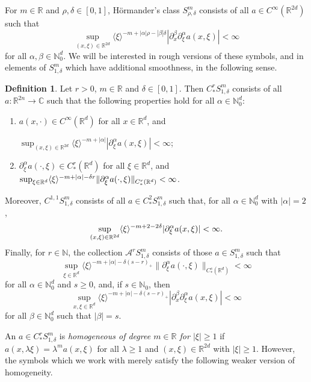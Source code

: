 \documentclass{amsart}
\numberwithin{equation}{section}
\theoremstyle{definition}
\newtheorem{definition}[theorem]{Definition}
\newcommand{\R}{\mathbb{R}}
\newcommand{\Rd}{\mathbb{R}^{d}}
\newcommand{\Rn}{\mathbb{R}^{d}}
\newcommand{\N}{\mathbb{N}}
\newcommand{\C}{\mathbb{C}}
\newcommand {\A}{\mathcal{A}}
\newcommand {\la}{\lambda}
\newcommand {\rb}{\rangle}
\newcommand {\lb}{\langle}
\begin{document}
For $m\in\R$ and $\rho,\delta\in[0,1]$, H\"{o}rmander's class $S^{m}_{\rho,\delta}$ consists of all $a\in C^{\infty}(\R^{2d})$ such that 
\[
\sup_{(x,\xi)\in\R^{2d}}\lb \xi\rb^{-m+|\alpha|\rho-|\beta|\delta}|\partial_{x}^{\beta}\partial_{\xi}^{\alpha}a(x,\xi)|<\infty
\]
for all $\alpha,\beta\in\N_{0}^{d}$. 
We will be interested in rough versions of these symbols,  
and in elements of $S^{m}_{1,\delta}$ which have additional smoothness, in the following sense.


\begin{definition}\label{def:symbolrough}
Let $r>0$, $m\in\R$ and $\delta\in[0,1]$. Then $C^{r}_{*}S^{m}_{1,\delta}$ consists of all $a:\R^{2n}\to\C$ such that the following properties hold for all $\alpha\in \N_{0}^{d}$:
\begin{enumerate}
\item\label{it:symbolrough1} $a(x,\cdot)\in C^{\infty}(\Rn)$ for all $x\in\Rn$, and 

$\sup_{(x,\xi)\in\R^{2d}}\lb\xi\rb^{-m+|\alpha|}|\partial_{\xi}^{\alpha}a(x,\xi)|<\infty$; 
\item\label{it:symbolrough2} $\partial_{\xi}^{\alpha}a(\cdot,\xi)\in C^{r}_{*}(\Rn)$ for all $\xi\in\Rn$,  
and
$\sup_{\xi\in\Rd}\lb\xi\rb^{-m+|\alpha|-\delta r}\|\partial_{\xi}^{\alpha}a(\cdot,\xi)\|_{C^{r}_{*}(\Rd)}\linebreak<\infty$.
\end{enumerate} 
Moreover, $C^{1,1}S^{m}_{1,\delta}$ consists of all $a\in C^{2}_{*}S^{m}_{1,\delta}$ such that, for all $\alpha\in \N_{0}^{d}$ with $|\alpha|=2$,
\[
\sup_{(x,\xi)\in\R^{2d}}\lb\xi\rb^{-m+2-2\delta}|\partial_{\xi}^{\alpha}a(x,\xi)|\linebreak<\infty.
\]
Finally, for $r\in\N$, the collection $\A^{r}S^{m}_{1,\delta}$ consists of those $a\in S^{m}_{1,\delta}$ such that 
\[
\sup_{\xi\in\Rd}\lb\xi\rb^{-m+|\alpha|-\delta(s-r)_{+}}\|\partial_{\xi}^{\alpha}a(\cdot,\xi)\|_{C^{s}_{*}(\Rd)}<\infty
\] 
for all $\alpha\in\N_{0}^{d}$ and $s\geq0$, and, if $s\in\N_{0}$, then 
\[
\sup_{x,\xi\in\Rd}\lb\xi\rb^{-m+|\alpha|-\delta(s-r)_{+}}|\partial_{x}^{\beta}\partial_{\xi}^{\alpha}a(x,\xi)|<\infty
\]
for all $\beta\in\N_{0}^{d}$  such that $|\beta|=s$.
\end{definition}

An $a\in C^{r}_{*}S^{m}_{1,\delta}$ is \emph{homogeneous of degree $m\in\R$ for $|\xi|\geq 1$} if 
$a(x,\la\xi)=\la^{m} a(x,\xi)$ for all $\lambda\geq 1$ and $(x,\xi)\in\R^{2d}$ with $|\xi|\geq1$. 
However, the symbols which we work with merely satisfy the following weaker version of homogeneity. 
\end{document}
